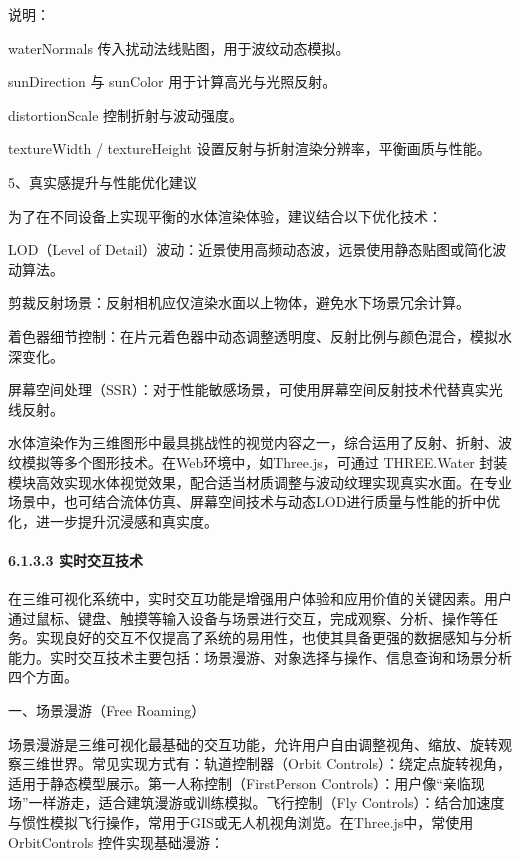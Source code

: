 说明：

waterNormals 传入扰动法线贴图，用于波纹动态模拟。

sunDirection 与 sunColor 用于计算高光与光照反射。

distortionScale 控制折射与波动强度。

textureWidth / textureHeight 设置反射与折射渲染分辨率，平衡画质与性能。

5、真实感提升与性能优化建议

为了在不同设备上实现平衡的水体渲染体验，建议结合以下优化技术：

LOD（Level of Detail）波动：近景使用高频动态波，远景使用静态贴图或简化波动算法。

剪裁反射场景：反射相机应仅渲染水面以上物体，避免水下场景冗余计算。

着色器细节控制：在片元着色器中动态调整透明度、反射比例与颜色混合，模拟水深变化。

屏幕空间处理（SSR）：对于性能敏感场景，可使用屏幕空间反射技术代替真实光线反射。

水体渲染作为三维图形中最具挑战性的视觉内容之一，综合运用了反射、折射、波纹模拟等多个图形技术。在Web环境中，如Three.js，可通过 THREE.Water 封装模块高效实现水体视觉效果，配合适当材质调整与波动纹理实现真实水面。在专业场景中，也可结合流体仿真、屏幕空间技术与动态LOD进行质量与性能的折中优化，进一步提升沉浸感和真实度。

\paragraph{6.1.3.3 实时交互技术}\label{ux5b9eux65f6ux4ea4ux4e92ux6280ux672f}

在三维可视化系统中，实时交互功能是增强用户体验和应用价值的关键因素。用户通过鼠标、键盘、触摸等输入设备与场景进行交互，完成观察、分析、操作等任务。实现良好的交互不仅提高了系统的易用性，也使其具备更强的数据感知与分析能力。实时交互技术主要包括：场景漫游、对象选择与操作、信息查询和场景分析四个方面。

一、场景漫游（Free Roaming）

场景漫游是三维可视化最基础的交互功能，允许用户自由调整视角、缩放、旋转观察三维世界。常见实现方式有：轨道控制器（Orbit Controls）：绕定点旋转视角，适用于静态模型展示。第一人称控制（FirstPerson Controls）：用户像``亲临现场''一样游走，适合建筑漫游或训练模拟。飞行控制（Fly Controls）：结合加速度与惯性模拟飞行操作，常用于GIS或无人机视角浏览。在Three.js中，常使用 OrbitControls 控件实现基础漫游：

